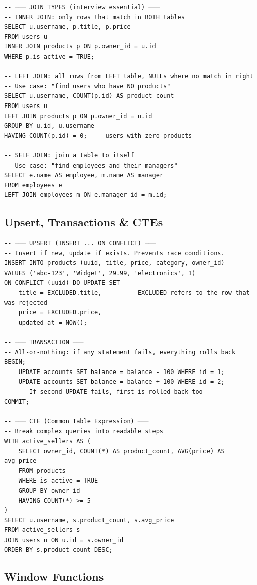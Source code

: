 \documentclass[10pt, a4paper]{article}
\begin{document}
\begin{lstlisting}[language=mysql]
-- ─── JOIN TYPES (interview essential) ───
-- INNER JOIN: only rows that match in BOTH tables
SELECT u.username, p.title, p.price
FROM users u
INNER JOIN products p ON p.owner_id = u.id
WHERE p.is_active = TRUE;

-- LEFT JOIN: all rows from LEFT table, NULLs where no match in right
-- Use case: "find users who have NO products"
SELECT u.username, COUNT(p.id) AS product_count
FROM users u
LEFT JOIN products p ON p.owner_id = u.id
GROUP BY u.id, u.username
HAVING COUNT(p.id) = 0;  -- users with zero products

-- SELF JOIN: join a table to itself
-- Use case: "find employees and their managers"
SELECT e.name AS employee, m.name AS manager
FROM employees e
LEFT JOIN employees m ON e.manager_id = m.id;
\end{lstlisting}


\subsection{Upsert, Transactions \& CTEs}


\begin{lstlisting}[language=mysql]
-- ─── UPSERT (INSERT ... ON CONFLICT) ───
-- Insert if new, update if exists. Prevents race conditions.
INSERT INTO products (uuid, title, price, category, owner_id)
VALUES ('abc-123', 'Widget', 29.99, 'electronics', 1)
ON CONFLICT (uuid) DO UPDATE SET
    title = EXCLUDED.title,       -- EXCLUDED refers to the row that was rejected
    price = EXCLUDED.price,
    updated_at = NOW();

-- ─── TRANSACTION ───
-- All-or-nothing: if any statement fails, everything rolls back
BEGIN;
    UPDATE accounts SET balance = balance - 100 WHERE id = 1;
    UPDATE accounts SET balance = balance + 100 WHERE id = 2;
    -- If second UPDATE fails, first is rolled back too
COMMIT;

-- ─── CTE (Common Table Expression) ───
-- Break complex queries into readable steps
WITH active_sellers AS (
    SELECT owner_id, COUNT(*) AS product_count, AVG(price) AS avg_price
    FROM products
    WHERE is_active = TRUE
    GROUP BY owner_id
    HAVING COUNT(*) >= 5
)
SELECT u.username, s.product_count, s.avg_price
FROM active_sellers s
JOIN users u ON u.id = s.owner_id
ORDER BY s.product_count DESC;
\end{lstlisting}


\subsection{Window Functions}
\end{document}
